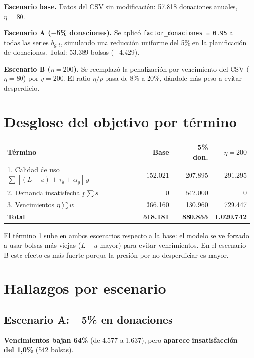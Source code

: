 \documentclass[11pt, a4paper]{article}
\begin{document}
\textbf{Escenario base.} Datos del CSV sin modificación: 57.818 donaciones anuales, $\eta = 80$.

\textbf{Escenario A ($-$5\% donaciones).} Se aplicó \texttt{factor\_donaciones = 0.95} a todas las series $b_{g,t}$, simulando una reducción uniforme del 5\% en la planificación de donaciones. Total: 53.389 bolsas (\(-\)4.429).

\textbf{Escenario B ($\eta = 200$).} Se reemplazó la penalización por vencimiento del CSV ($\eta = 80$) por $\eta = 200$. El ratio $\eta/p$ pasa de 8\% a 20\%, dándole más peso a evitar desperdicio.

\section{Desglose del objetivo por término}

\begin{center}
\begin{tabular}{lrrr}
\toprule
\rowcolor{rowgray}\textbf{Término} & \textbf{Base} & \textbf{$-$5\% don.} & \textbf{$\eta=200$}\\
\midrule
1. Calidad de uso $\sum[(L-u)+\tau_h+\alpha_g]\,y$ & 152.021 & 207.895 & 291.295 \\
2. Demanda insatisfecha $p\sum s$ & 0 & 542.000 & 0 \\
3. Vencimientos $\eta\sum w$ & 366.160 & 130.960 & 729.447 \\
\midrule
\textbf{Total} & \textbf{518.181} & \textbf{880.855} & \textbf{1.020.742} \\
\bottomrule
\end{tabular}
\end{center}

El término 1 sube en ambos escenarios respecto a la base: el modelo se ve forzado a usar bolsas más viejas (\(L-u\) mayor) para evitar vencimientos. En el escenario B este efecto es más fuerte porque la presión por no desperdiciar es mayor.

\section{Hallazgos por escenario}

\subsection{Escenario A: $-$5\% en donaciones}

\textbf{Vencimientos bajan 64\%} (de 4.577 a 1.637), pero \textbf{aparece insatisfacción del 1,0\%} (542 bolsas).
\end{document}
